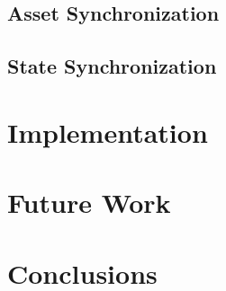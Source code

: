 \documentclass{article}
\begin{document}
\subsection{Asset Synchronization}
\label{assetsynchronization}


\subsection{State Synchronization}
\label{statesynchronization}


\section{Implementation}
\label{implementation}


\section{Future Work}
\label{futurework}


\section{Conclusions}
\label{conclusions}




\end{document}
